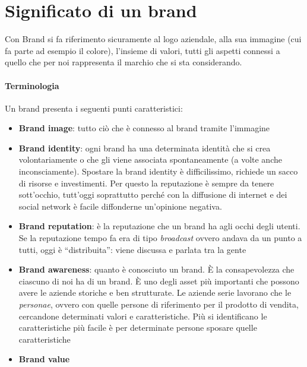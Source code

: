 \section{Significato di un brand}

Con Brand si fa riferimento sicuramente al logo aziendale, alla sua immagine
(cui fa parte ad esempio il colore), l'insieme di valori, tutti gli aspetti
connessi a quello che per noi rappresenta il marchio che si sta considerando.

\paragraph*{Terminologia} Un brand presenta i seguenti punti caratteristici:
\begin{itemize}
 \item \textbf{Brand image}: tutto ciò che è connesso al brand tramite
l'immagine
 \item \textbf{Brand identity}: ogni brand ha una determinata identità che si
crea volontariamente o che gli viene associata spontaneamente (a volte anche
inconsciamente).
Spostare la brand identity è difficilissimo, richiede un sacco di risorse e
investimenti.
Per questo la reputazione è sempre da tenere sott'occhio, tutt'oggi soprattutto
perché con la diffusione di internet e dei social network è facile diffonderne
un'opinione negativa.
 \item \textbf{Brand reputation}: è la reputazione che un brand ha agli occhi
degli utenti.
Se la reputazione tempo fa era di tipo \textit{broadcast} ovvero andava da un
punto a tutti, oggi è ``distribuita'': viene discussa e parlata tra la gente
 \item \textbf{Brand awareness}: quanto è conosciuto un brand.
È la consapevolezza che ciascuno di noi ha di un brand.
È uno degli asset più importanti che possono avere le aziende storiche e ben
strutturate.
Le aziende serie lavorano che le \textit{personae}, ovvero con quelle persone
di riferimento per il prodotto di vendita, cercandone determinati valori e
caratteristiche.
Più si identificano le caratteristiche più facile è per determinate persone
sposare quelle caratteristiche
 \item \textbf{Brand value}
\end{itemize}
